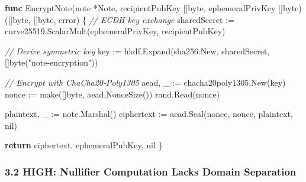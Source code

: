 \documentclass[
]{article}
\newenvironment{Shaded}{}{}
\newcommand{\BuiltInTok}[1]{\textcolor[rgb]{0.00,0.50,0.00}{#1}}
\newcommand{\CommentTok}[1]{\textcolor[rgb]{0.38,0.63,0.69}{\textit{#1}}}
\newcommand{\ControlFlowTok}[1]{\textcolor[rgb]{0.00,0.44,0.13}{\textbf{#1}}}
\newcommand{\DataTypeTok}[1]{\textcolor[rgb]{0.56,0.13,0.00}{#1}}
\newcommand{\KeywordTok}[1]{\textcolor[rgb]{0.00,0.44,0.13}{\textbf{#1}}}
\newcommand{\NormalTok}[1]{#1}
\newcommand{\OperatorTok}[1]{\textcolor[rgb]{0.40,0.40,0.40}{#1}}
\newcommand{\OtherTok}[1]{\textcolor[rgb]{0.00,0.44,0.13}{#1}}
\newcommand{\StringTok}[1]{\textcolor[rgb]{0.25,0.44,0.63}{#1}}
\begin{document}
\begin{Shaded}
\begin{Highlighting}[]
\KeywordTok{func}\NormalTok{ EncryptNote}\OperatorTok{(}\NormalTok{note }\OperatorTok{*}\NormalTok{Note}\OperatorTok{,}\NormalTok{ recipientPubKey }\OperatorTok{[]}\DataTypeTok{byte}\OperatorTok{,}\NormalTok{ ephemeralPrivKey }\OperatorTok{[]}\DataTypeTok{byte}\OperatorTok{)} \OperatorTok{([]}\DataTypeTok{byte}\OperatorTok{,} \OperatorTok{[]}\DataTypeTok{byte}\OperatorTok{,} \DataTypeTok{error}\OperatorTok{)} \OperatorTok{\{}
    \CommentTok{// ECDH key exchange}
\NormalTok{    sharedSecret }\OperatorTok{:=}\NormalTok{ curve25519}\OperatorTok{.}\NormalTok{ScalarMult}\OperatorTok{(}\NormalTok{ephemeralPrivKey}\OperatorTok{,}\NormalTok{ recipientPubKey}\OperatorTok{)}
    
    \CommentTok{// Derive symmetric key}
\NormalTok{    key }\OperatorTok{:=}\NormalTok{ hkdf}\OperatorTok{.}\NormalTok{Expand}\OperatorTok{(}\NormalTok{sha256}\OperatorTok{.}\NormalTok{New}\OperatorTok{,}\NormalTok{ sharedSecret}\OperatorTok{,} \OperatorTok{[]}\DataTypeTok{byte}\OperatorTok{(}\StringTok{"note{-}encryption"}\OperatorTok{))}
    
    \CommentTok{// Encrypt with ChaCha20{-}Poly1305}
\NormalTok{    aead}\OperatorTok{,}\NormalTok{ \_ }\OperatorTok{:=}\NormalTok{ chacha20poly1305}\OperatorTok{.}\NormalTok{New}\OperatorTok{(}\NormalTok{key}\OperatorTok{)}
\NormalTok{    nonce }\OperatorTok{:=} \BuiltInTok{make}\OperatorTok{([]}\DataTypeTok{byte}\OperatorTok{,}\NormalTok{ aead}\OperatorTok{.}\NormalTok{NonceSize}\OperatorTok{())}
\NormalTok{    rand}\OperatorTok{.}\NormalTok{Read}\OperatorTok{(}\NormalTok{nonce}\OperatorTok{)}
    
\NormalTok{    plaintext}\OperatorTok{,}\NormalTok{ \_ }\OperatorTok{:=}\NormalTok{ note}\OperatorTok{.}\NormalTok{Marshal}\OperatorTok{()}
\NormalTok{    ciphertext }\OperatorTok{:=}\NormalTok{ aead}\OperatorTok{.}\NormalTok{Seal}\OperatorTok{(}\NormalTok{nonce}\OperatorTok{,}\NormalTok{ nonce}\OperatorTok{,}\NormalTok{ plaintext}\OperatorTok{,} \OtherTok{nil}\OperatorTok{)}
    
    \ControlFlowTok{return}\NormalTok{ ciphertext}\OperatorTok{,}\NormalTok{ ephemeralPubKey}\OperatorTok{,} \OtherTok{nil}
\OperatorTok{\}}
\end{Highlighting}
\end{Shaded}

\subsubsection{3.2 HIGH: Nullifier Computation Lacks Domain
Separation}\label{32-high-nullifier-computation-lacks-domain-separation}
\end{document}
